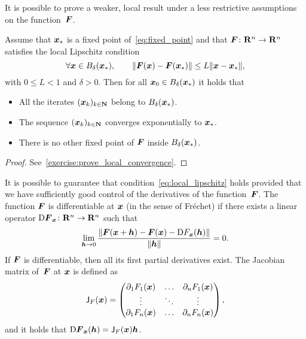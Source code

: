 It is possible to prove a weaker, local result under a less restrictive assumptions on the function~$\mathbf{\boldsymbol{F}}$.
\begin{theorem}
    \label{theorem:local_convergence}
    Assume that $\mathbf{\boldsymbol{x}}_*$ is a fixed point of~\eqref{eq:fixed_point} and that $\mathbf{\boldsymbol{F}}\colon \mathbf R^n \to \mathbf R^n$ satisfies the local Lipschitz condition
    \begin{equation}
        \label{eq:local_lipschitz}
        \forall \vect x \in B_{\delta}(\vect x_*), \qquad
        \norm[big]{\vect F(\vect x) - \vect F(\vect x_*)} \leq L \norm{\vect x - \vect x_*},
    \end{equation}
    with $0 \leq L < 1$ and $\delta > 0$.
    Then for all $\mathbf{\boldsymbol{x}}_0 \in B_{\delta}(\mathbf{\boldsymbol{x}}_*)$ it holds that
    \begin{itemize}
        \item All the iterates $(\mathbf{\boldsymbol{x}}_k)_{k \in \mathbf N}$ belong to $B_{\delta}(\mathbf{\boldsymbol{x}}_*)$.
        \item The sequence $(\mathbf{\boldsymbol{x}}_k)_{k \in \mathbf N}$ converges exponentially to $\mathbf{\boldsymbol{x}}_*$.
        \item There is no other fixed point of $\mathbf{\boldsymbol{F}}$ inside $B_{\delta}(\mathbf{\boldsymbol{x}}_*)$.
    \end{itemize}
\end{theorem}
\begin{proof}
    See~\cref{exercise:prove_local_convergence}.
\end{proof}
It is possible to guarantee that condition~\eqref{eq:local_lipschitz} holds provided that
we have sufficiently good control of the derivatives of the function~$\mathbf{\boldsymbol{F}}$.
The function $\mathbf{\boldsymbol{F}}$ is differentiable at $\mathbf{\boldsymbol{x}}$ (in the sense of Fréchet) if
there exists a linear operator $\mathrm D \mathbf{\boldsymbol{F}}_{\mathbf{\boldsymbol{x}}} \colon \mathbf R^n \to \mathbf R^n$ such that
\begin{equation}
    \label{eq:limit_differentiability}
    \lim_{\mathbf{\boldsymbol{h}} \to 0} \frac{\lVert\mathbf{\boldsymbol{F}}(\mathbf{\boldsymbol{x}} + \mathbf{\boldsymbol{h}}) - \mathbf{\boldsymbol{F}}(\mathbf{\boldsymbol{x}}) - \mathrm D F_{\mathbf{\boldsymbol{x}}}(\mathbf{\boldsymbol{h}})\rVert}{\lVert\mathbf{\boldsymbol{h}}\rVert}
    = 0.
\end{equation}
If $\mathbf{\boldsymbol{F}}$ is differentiable,
then all its first partial derivatives exist.
The Jacobian matrix of~$\mathbf{\boldsymbol{F}}$ at $\mathbf{\boldsymbol{x}}$ is defined as
\[
    \mathsf J_F(\mathbf{\boldsymbol{x}}) =
    \begin{pmatrix}
        \partial_{1} F_1(\mathbf{\boldsymbol{x}}) & \hdots & \partial_n F_1(\mathbf{\boldsymbol{x}}) \\
        \vdots & \ddots & \vdots \\
        \partial_{1} F_n(\mathbf{\boldsymbol{x}}) & \hdots & \partial_n F_n(\mathbf{\boldsymbol{x}})
    \end{pmatrix},
\]
and it holds that $\mathrm D \mathbf{\boldsymbol{F}}_{\mathbf{\boldsymbol{x}}}(\mathbf{\boldsymbol{h}}) = \mathsf J_F(\mathbf{\boldsymbol{x}}) \mathbf{\boldsymbol{h}}$.

